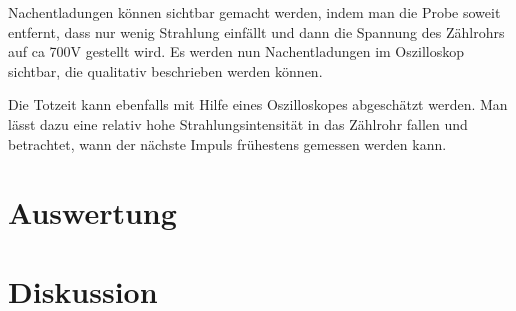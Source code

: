 Nachentladungen können sichtbar gemacht werden, indem man die Probe soweit entfernt, dass nur wenig Strahlung einfällt und dann die Spannung des Zählrohrs auf ca 700V gestellt wird. Es werden nun Nachentladungen im Oszilloskop sichtbar, die qualitativ beschrieben werden können.

Die Totzeit kann ebenfalls mit Hilfe eines Oszilloskopes abgeschätzt werden. Man lässt dazu eine relativ hohe Strahlungsintensität in das Zählrohr fallen und betrachtet, wann der nächste Impuls frühestens gemessen werden kann. 

\section{Auswertung}

\section{Diskussion}





